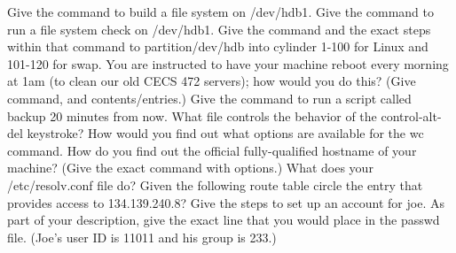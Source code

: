 \ques
Give the command to build a file system on {\ltt{}/dev/hdb1}.
\vskip 0.6in
Give the command to run a file system check on {\ltt{}/dev/hdb1}.
\vskip 0.6in
Give the command and the exact steps within that command to
partition{\ltt{}/dev/hdb} into cylinder 1-100 for Linux and 101-120
for swap.
\vskip 1.6in
\vfill\eject
\ques
You are instructed to have your machine reboot every morning
at 1am (to clean our old CECS 472 servers);
how would you do this? (Give command, and contents/entries.)
\vskip 1.2in
Give the command to run a script called {\ltt{}backup}
20 minutes from now.
\vskip 0.5in
What file controls the behavior of the control-alt-del
keystroke?
\vskip 0.5in
\ques
How would you find out what options are available for
the {\ltt{}wc} command.
\vskip 0.5in
How do you find out the official fully-qualified hostname of your machine?
(Give the exact command with options.)
\vskip 0.5in
What does your {\ltt{}/etc/resolv.conf} file do?
\vskip 1.2in
Given the following route table circle the entry
that provides access to 134.139.240.8?
\vskip 0.5in
\ques
Give the steps to set up an account for {\ltt{}joe}.
As part of your description, give the exact line that you would
place in the {\ltt{}passwd} file. (Joe's user ID is 11011
and his group is 233.)
\vskip 2.0in
\bye
